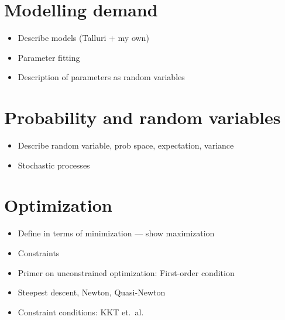 \documentclass[main.tex]{subfiles}
\begin{document}
\section{Modelling demand}
\begin{itemize}
\item Describe models (Talluri + my own)
\item Parameter fitting
\item Description of parameters as random variables
\end{itemize}

\section{Probability and random variables}
\begin{itemize}
\item Describe random variable, prob space, expectation, variance
\item Stochastic processes
\end{itemize}

\section{Optimization}

\begin{itemize}
\item Define in terms of minimization --- show maximization
\item Constraints
\item Primer on unconstrained optimization: First-order condition
\item Steepest descent, Newton, Quasi-Newton
\item Constraint conditions: KKT et.\ al.
\end{itemize}

\biblio{} %
\end{document}

